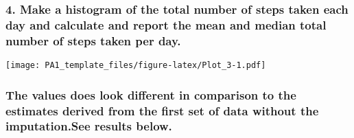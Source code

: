 \documentclass[]{article}
\newenvironment{Shaded}{\begin{snugshade}}{\end{snugshade}}
\newcommand{\KeywordTok}[1]{\textcolor[rgb]{0.13,0.29,0.53}{\textbf{#1}}}
\newcommand{\DataTypeTok}[1]{\textcolor[rgb]{0.13,0.29,0.53}{#1}}
\newcommand{\StringTok}[1]{\textcolor[rgb]{0.31,0.60,0.02}{#1}}
\newcommand{\CommentTok}[1]{\textcolor[rgb]{0.56,0.35,0.01}{\textit{#1}}}
\newcommand{\OtherTok}[1]{\textcolor[rgb]{0.56,0.35,0.01}{#1}}
\newcommand{\OperatorTok}[1]{\textcolor[rgb]{0.81,0.36,0.00}{\textbf{#1}}}
\newcommand{\NormalTok}[1]{#1}
\begin{document}
\begin{Shaded}
\end{Shaded}

\subsubsection{4. Make a histogram of the total number of steps taken
each day and calculate and report the mean and median total number of
steps taken per
day.}\label{make-a-histogram-of-the-total-number-of-steps-taken-each-day-and-calculate-and-report-the-mean-and-median-total-number-of-steps-taken-per-day.}

\begin{Shaded}
\end{Shaded}

\texttt{[image: PA1\_template\_files/figure-latex/Plot\_3-1.pdf]}

\subsubsection{The values does look different in comparison to the
estimates derived from the first set of data without the imputation.See
results
below.}\label{the-values-does-look-different-in-comparison-to-the-estimates-derived-from-the-first-set-of-data-without-the-imputation.see-results-below.}
\end{document}
